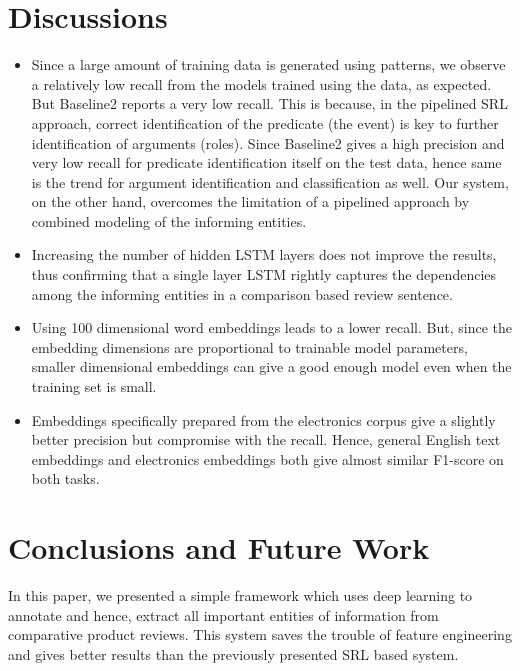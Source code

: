 \section{Discussions}
\begin{itemize}[leftmargin=*]
\item Since a large amount of training data is generated using patterns, we observe a relatively low recall from the models trained using the data, as expected. But Baseline2 reports a very low recall. This is because, in the pipelined SRL approach, correct identification of the predicate (the event) is key to further identification of arguments (roles). Since Baseline2 gives a high precision and very low recall for predicate identification itself on the test data, hence same is the trend for argument identification and classification as well. Our system, on the other hand, overcomes the limitation of a pipelined approach by combined modeling of the informing entities.

\item Increasing the number of hidden LSTM layers does not improve the results, thus confirming that a single layer LSTM rightly captures the dependencies among the informing entities in a comparison based review sentence.

\item Using 100 dimensional word embeddings leads to a lower recall. But, since the embedding dimensions are proportional to trainable model parameters, smaller dimensional embeddings can give a good enough model even when the training set is small.

\item Embeddings specifically prepared from the electronics corpus give a slightly better precision but compromise with the recall. Hence, general English text embeddings and electronics embeddings both give almost similar F1-score on both tasks.

\vspace{-0.5em}
\end{itemize}

\section{Conclusions and Future Work}
In this paper, we presented a simple framework which uses deep learning to annotate and hence, extract all important entities of information from comparative product reviews. This system saves the trouble of feature engineering and gives better results than the previously presented SRL based system.


